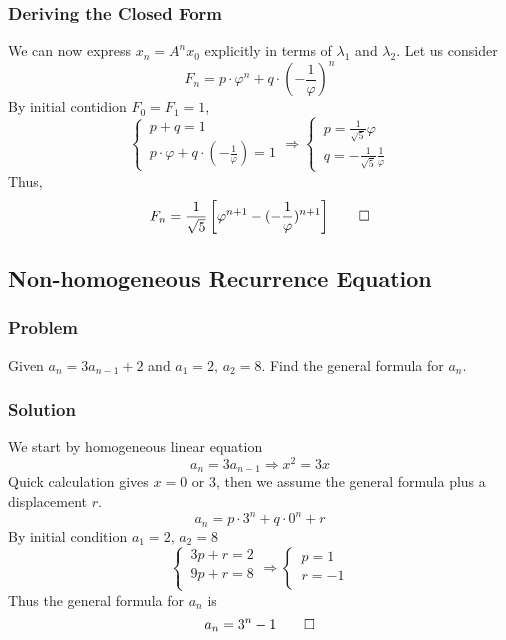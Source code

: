 \documentclass[11pt]{article}
\begin{document}
\subsubsection{Deriving the Closed Form}
We can now express $x_n = A^n x_0$ explicitly in terms of $\lambda_1$ and $\lambda_2$. Let us consider
\[
    F_n=p\cdot\varphi^n + q\cdot(-\frac{1}{\varphi})^n
\]
By initial contidion $F_0=F_1=1$, 
\[
    \begin{cases}
        \displaystyle
        \,p+q=1\\
        \displaystyle
        \,p\cdot\varphi + q\cdot (-\frac{1}{\varphi}) = 1
    \end{cases}
    \Rightarrow
    \begin{cases}
        \displaystyle
        \,p=\frac{1}{\sqrt{5}}\varphi\\
        \displaystyle
        \,q=-\frac{1}{\sqrt{5}}\frac{1}{\varphi}
    \end{cases}
\]
Thus, 
\[
    F_n = \frac{1}{\sqrt{5}}\left[\varphi^{n+1} - (-\frac{1}{\varphi})^{n+1}\right] \qed
\]
\subsection{Non-homogeneous Recurrence Equation}
\subsubsection{Problem}
Given $a_n=3a_{n-1}+2$  and $a_1 = 2,\,a_2 = 8$. Find the general formula for $a_n$. 
\subsubsection*{Solution}
We start by  homogeneous linear equation
\[
    a_n=3a_{n-1}\Rightarrow x^2=3x
\]
Quick calculation gives $\displaystyle x=0 \text{ or }3$, then we assume the general formula plus a displacement $r$.
\[
    a_n=p\cdot 3^n + q\cdot 0^n + r
\]
By initial condition $a_1 = 2,\, a_2 = 8$
\[
    \begin{cases}
        \displaystyle
        \,3p+r=2\\
        \displaystyle
        \,9p+r=8\\
    \end{cases}
    \Rightarrow
    \begin{cases}
        \displaystyle
        \,p=1\\
        \displaystyle
        \,r=-1\\
    \end{cases}
\]
Thus the general formula for $a_n$ is 
\[
    a_n = 3^n - 1 \qed
\]
\end{document}
